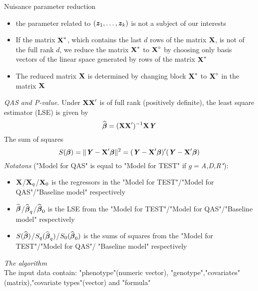 \documentclass[11pt]{article}
\begin{document}
Nuisance parameter reduction\vspace{-2mm}
\begin{itemize}
\setlength\itemsep{-0.3em}
\item[]
the parameter related to $(\mbox{\textbf{\textit z}}_1,\ldots,\mbox{\textbf{\textit z}}_k)$ is not a subject of our interests
\item[]
If the matrix $\mbox{\bf X}^*$, which contains the last $d$ rows of the matrix $\mbox{\bf X}$, is not of the full rank $d$, we reduce the matrix $\mbox{\bf X}^*$ to $\mbox{\bf X}^{\circ}$ by choosing only basis vectors of the linear space generated by rows of the matrix $\mbox{\bf X}^*$
\item[]
The reduced matrix $\mbox{\bf X}$ is determined by changing block $\mbox{\bf X}^*$ to $\mbox{\bf X}^{\circ}$ in the matrix $\mbox{\bf X}$
\end{itemize}
{\it QAS and P-value.} Under $\mbox{\bf X}\mbox{\bf X}'$ is of full rank (positively definite), the least square estimator (LSE) is given by 
$$
\widehat{{\boldsymbol \beta}}=(\mbox{\bf X}\mbox{\bf X}')^{-1}\mbox{\bf X}\mbox{\textbf{\textit Y}}
$$
The sum of squares
$$
S({\boldsymbol \beta})=\|\mbox{\textbf{\textit Y}}-\mbox{\bf X}'{\boldsymbol \beta}\|^2=(\mbox{\textbf{\textit Y}}-\mbox{\bf X}'{\boldsymbol \beta})'(\mbox{\textbf{\textit Y}}-\mbox{\bf X}'{\boldsymbol \beta})
$$
{\it Notatons} ("Model for QAS" is equal to "Model for TEST" if $g=${\it A,D,R"}): 
\vspace{-2mm}
\begin{itemize}
\setlength\itemsep{-0.3em}
\item[]
$\mbox{\bf X}$/$\mbox{\bf X}_q$/$\mbox{\bf X}_0$ is the regressors in the "Model for TEST"/"Model for QAS"/"Baseline model" respectively
\item[]
$\widehat{{\boldsymbol \beta}}$/$\widehat{{\boldsymbol \beta}}_q$/$\widehat{{\boldsymbol \beta}}_0$ is the LSE from the "Model for TEST"/"Model for QAS"/"Baseline model" respectively
\item[]
$S(\widehat{{\boldsymbol \beta}})$/$S_q(\widehat{{\boldsymbol \beta}}_q)$/$S_0(\widehat{{\boldsymbol \beta}}_0)$ is the sums of squares from the "Model for TEST"/"Model for QAS"/ "Baseline model" respectively
\end{itemize}
{\it The algorithm} \\
The input data contain: "phenotype"(numeric vector), "genotype","covariates"(matrix),"covariate types"(vector) and "formula"
 \vspace{-2mm}
\end{document}
